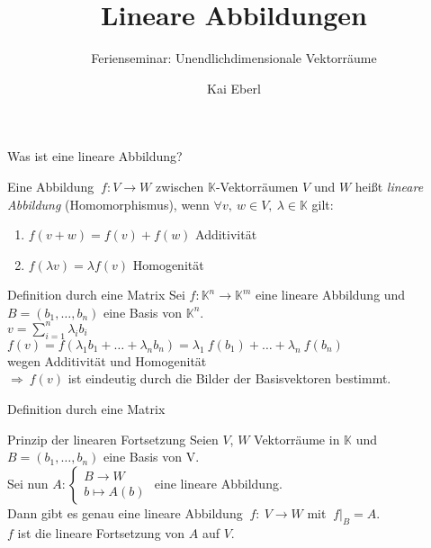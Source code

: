\documentclass[AERbeamer%
,optBeamerClassicFormat%
,optLeftEquations   %
]{AERlatex}
\title{Lineare Abbildungen}%
\subtitle{Ferienseminar: Unendlichdimensionale Vektorräume}%
\author{Kai Eberl}%
\date{\AERutilsDate{5}{9}{2022}}%
\begin{document}
%
%
    \AERbeamerTitlePageDefault%
%
    \begin{frame}{Was ist eine lineare Abbildung?}%
        \begin{Definition}
            Eine Abbildung $~f: V \rightarrow W$ zwischen $\mathbb{K}$-Vektorräumen $V$ und $W$ heißt \emph{lineare Abbildung} (Homomorphismus), wenn $\forall v, ~ w \in V, ~ \lambda \in \mathbb{K}$ gilt: \\ \pause
            \begin{enumerate}
                [label=$(\roman*)$, leftmargin=2em]
                \item $f(v+w) = f(v) + f(w)$ \hspace{2em} Additivität \pause
                \item $f(\lambda v) = \lambda f(v)$ \hspace{6em} Homogenität
            \end{enumerate}
        \end{Definition}
    \end{frame}%
%
    \begin{frame}{Definition durch eine Matrix}
        \setlength{\baselineskip}{1.6\baselineskip}
%
        Sei $f: \mathbb{K}^n \rightarrow \mathbb{K}^m$ eine lineare Abbildung und $B=(b_1, \dots , b_n)$ eine Basis von $\mathbb{K}^n$. \\
        $v = \sum_{i=1}^n \lambda_i b_i$ \\ \pause
        $f(v) = f(\lambda_1 b_1 + \dots + \lambda_n b_n) = \lambda_1 ~ f(b_1) + \dots + \lambda_n ~ f(b_n)$ \\
        \hspace{2em}wegen Additivität und Homogenität \\ \pause
        $\Rightarrow ~ f(v)$ ist eindeutig durch die Bilder der Basisvektoren bestimmt.
    \end{frame}
%
    \begin{frame}{Definition durch eine Matrix}
        \begin{block}{Prinzip der linearen Fortsetzung}
            \setlength{\baselineskip}{1.3\baselineskip}
            Seien $V$, $W$ Vektorräume in $\mathbb{K}$ und $B=(b_1, \dots, b_n)$ eine Basis von V. \\
            Sei nun $A:\left\{\begin{array}{l}
                                  B \rightarrow W \\ b \mapsto A(b)
            \end{array} \right.$ eine lineare Abbildung.                                           \\
            Dann gibt es genau eine lineare Abbildung $~ f: ~ V \rightarrow W$ mit $~ f|_B = A$. \\
            $f$ ist die lineare Fortsetzung von $A$ auf $V$.
        \end{block}
    \end{frame}
\end{document}
